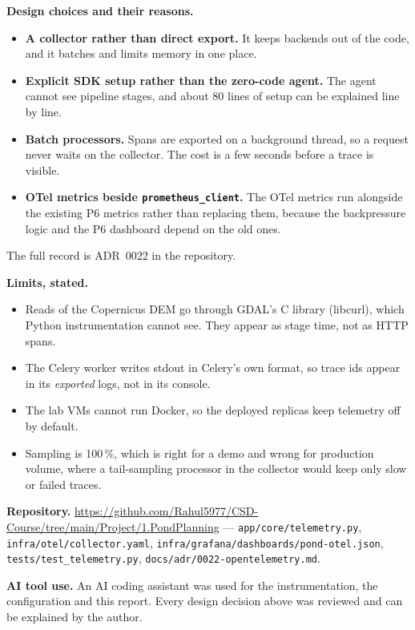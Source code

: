\documentclass[manuscript,screen,review]{acmart}
\newcommand{\repourl}{https://github.com/Rahul5977/CSD-Course/tree/main/Project/1.PondPlanning}
\begin{document}
\textbf{Design choices and their reasons.}
\begin{itemize}
  \item \textbf{A collector rather than direct export.} It keeps backends out of the code,
    and it batches and limits memory in one place.
  \item \textbf{Explicit SDK setup rather than the zero-code agent.} The agent cannot see
    pipeline stages, and about 80 lines of setup can be explained line by line.
  \item \textbf{Batch processors.} Spans are exported on a background thread, so a request
    never waits on the collector. The cost is a few seconds before a trace is visible.
  \item \textbf{OTel metrics beside \texttt{prometheus\_client}.} The OTel metrics run
    alongside the existing P6 metrics rather than replacing them, because the backpressure
    logic and the P6 dashboard depend on the old ones.
\end{itemize}
The full record is ADR~0022 in the repository.

\textbf{Limits, stated.}
\begin{itemize}
  \item Reads of the Copernicus DEM go through GDAL's C library (libcurl), which Python
    instrumentation cannot see. They appear as stage time, not as HTTP spans.
  \item The Celery worker writes stdout in Celery's own format, so trace ids appear in its
    \emph{exported} logs, not in its console.
  \item The lab VMs cannot run Docker, so the deployed replicas keep telemetry off by
    default.
  \item Sampling is 100\,\%, which is right for a demo and wrong for production volume,
    where a tail-sampling processor in the collector would keep only slow or failed traces.
\end{itemize}

\textbf{Repository.} \url{\repourl} --- \texttt{app/core/telemetry.py},
\texttt{infra/otel/collector.yaml}, \texttt{infra/grafana/dashboards/pond-otel.json},
\texttt{tests/test\_telemetry.py}, \texttt{docs/adr/0022-opentelemetry.md}.

\textbf{AI tool use.} An AI coding assistant was used for the
instrumentation, the configuration and this report. Every design decision above was
reviewed and can be explained by the author.
\end{document}
